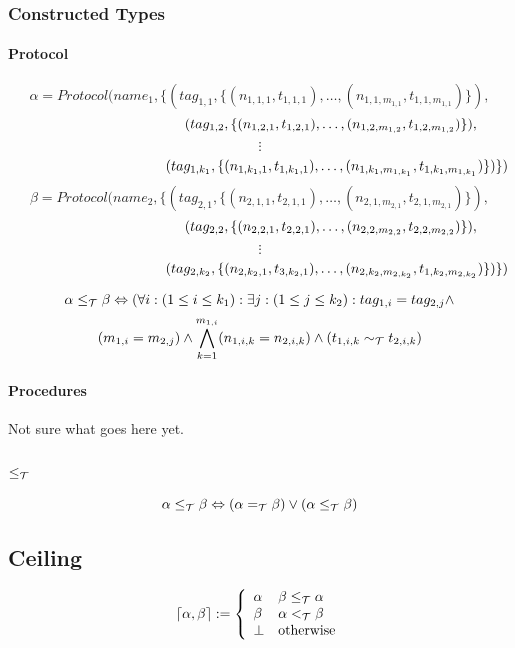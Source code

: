 \documentclass[]{article}
\begin{document}
\subsubsection{Constructed Types}

\paragraph{Protocol}

\[
\alpha = Protocol(name_1,\{(tag_{1,1},\{(n_{1,1,1},t_{1,1,1}),\ldots,(n_{1,1,m_{1,1}},t_{1,1,m_{1,1}})\}),
\]
\[
\hspace*{3.6cm}(tag_{1,2},\{(n_{1,2,1},t_{1,2,1}),\ldots,(n_{1,2,m_{1,2}},t_{1,2,m_{1,2}})\}),
\]
\[
\vdots
\]
\[
\hspace*{3.9cm}(tag_{1,k_1},\{(n_{1,k_1,1},t_{1,k_1,1}),\ldots,(n_{1,k_1,m_{1,k_1}},t_{1,k_1,m_{1,k_1}})\})\})
\]
\[
\beta = Protocol(name_2,\{(tag_{2,1},\{(n_{2,1,1},t_{2,1,1}),\ldots,(n_{2,1,m_{2,1}},t_{2,1,m_{2,1}})\}),
\]
\[
\hspace*{3.6cm}(tag_{2,2},\{(n_{2,2,1},t_{2,2,1}),\ldots,(n_{2,2,m_{2,2}},t_{2,2,m_{2,2}})\}),
\]
\[
\vdots
\]
\[
\hspace*{3.9cm}(tag_{2,k_2},\{(n_{2,k_2,1},t_{3,k_2,1}),\ldots,(n_{2,k_2,m_{2,k_2}},t_{1,k_2,m_{2,k_2}})\})\})
\]

\[
\alpha \leq_{\cal T} \beta \Leftrightarrow (\forall i: (1 \leq i \leq k_1): \exists j: (1 \leq j \leq k_2): tag_{1,i} = tag_{2,j} \wedge 
\]
\[
(m_{1,i} = m_{2,j}) \wedge \bigwedge^{m_{1,i}}_{k=1}(n_{1,i,k} = n_{2,i,k}) \wedge (t_{1,i,k} \sim_{\cal T} t_{2,i,k})
\]

\paragraph{Procedures}

Not sure what goes here yet.


\subsection{$\leq_{\cal T}$}

\[
\alpha \leq_{\cal T} \beta \Leftrightarrow (\alpha =_{\cal T} \beta) \vee (\alpha \leq_{\cal T} \beta)
\]

\subsection{Ceiling}

\[
\lceil \alpha, \beta \rceil := \left\{
\begin{array}{ll}
\alpha & \beta \leq_{\cal T} \alpha\\
\beta  & \alpha <_{\cal T} \beta\\
\bot   & \mbox{otherwise}
\end{array}\right.
\]
\end{document}
